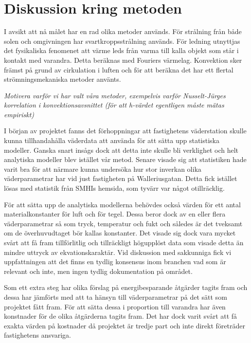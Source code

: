\section{Diskussion kring metoden}\label{sec:discmethod}

I avsikt att nå målet har en rad olika metoder används. För strålning från både solen och omgivningen har svartkroppsstrålning används. För ledning utnyttjas det fysikaliska fenomenet att värme leds från varma till kalla objekt som står i kontakt med varandra. Detta beräknas med Fouriers värmelag. Konvektion sker främst på grund av cirkulation i luften och för att beräkna det har ett flertal strömningsmekaniska metoder använts.

\emph{\color{red} Motivera varför vi har valt våra metoder, exempelvis varför Nusselt-Jürges korrelation i konvektionsavsnittet (för att h-värdet egentligen måste mätas empiriskt)}

I början av projektet fanns det förhoppningar att fastighetens väderstation skulle kunna tillhandahålla väderdata att använda för att sätta upp statistiska modeller. 
Ganska snart insågs dock att detta inte skulle bli verklighet och helt analytiska modeller blev istället vår metod. Senare visade sig att statistiken hade varit bra för att närmare kunna undersöka hur stor inverkan olika väderparametrar har vid just fastigheten på Walleriusgatan. 
Detta fick istället lösas med statistik från SMHIs hemsida, som tyvärr var något otillräcklig.

För att sätta upp de analytiska modellerna behövdes också värden för ett antal materialkonstanter för luft och för tegel. 
Dessa beror dock av en eller flera väderparametrar så som tryck, temperatur och fukt och således är det tveksamt om de överhuvudtaget bör kallas konstanter. 
Det visade sig dock vara mycket svårt att få fram tillförlitlig och tillräckligt högupplöst data som visade detta än mindre uttryck av ekvationskaraktär.
Vid diskussion med sakkunniga fick vi uppfattningen att det finns en tydlig konsensus inom branchen vad som är relevant och inte, men ingen tydlig dokumentation på området.

Som ett extra steg har olika förslag på energibesparande åtgärder tagits fram och dessa har jämförts med att ta hänsyn till väderparametrar på det sätt som projektet fått fram. För att sätta dessa i proportion till varandra har även konstnader för de olika åtgärderna tagits fram. Det har dock varit svårt att få exakta värden på kostnader då projektet är tredje part och inte direkt företräder fastighetens ansvariga.
